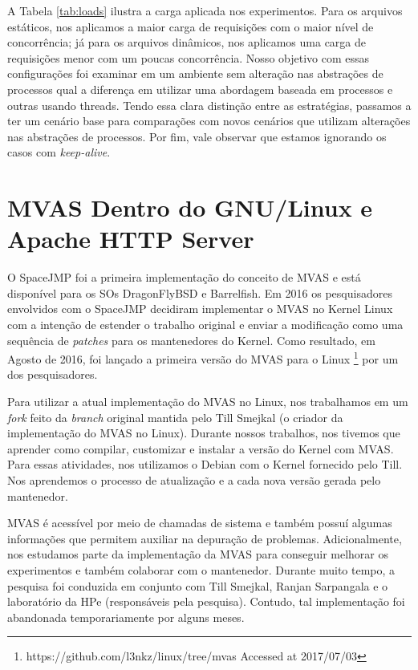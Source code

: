 A Tabela \ref{tab:loads} ilustra a carga aplicada nos experimentos. Para os
arquivos estáticos, nos aplicamos a maior carga de requisições com o maior
nível de concorrência; já para os arquivos dinâmicos, nos aplicamos uma carga
de requisições menor com um poucas concorrência. Nosso objetivo com essas
configurações foi examinar em um ambiente sem alteração nas abstrações de
processos qual a diferença em utilizar uma abordagem baseada em processos e
outras usando threads. Tendo essa clara distinção entre as estratégias,
passamos a ter um cenário base para comparações com novos cenários que utilizam
alterações nas abstrações de processos. Por fim, vale observar que estamos
ignorando os casos com \emph{keep-alive}.

\section{MVAS Dentro do GNU/Linux e Apache HTTP Server}
\label{sec:mvas_inside_httpd}

O SpaceJMP \citep{spacejmp} foi a primeira implementação do conceito de MVAS e
está disponível para os SOs DragonFlyBSD e Barrelfish. Em 2016 os pesquisadores
envolvidos com o SpaceJMP decidiram implementar o MVAS no Kernel Linux com a
intenção de estender o trabalho original e enviar a modificação como uma
sequência de \emph{patches} para os mantenedores do Kernel. Como resultado, em
Agosto de 2016, foi lançado a primeira versão do MVAS para o Linux
\footnote{https://github.com/l3nkz/linux/tree/mvas Accessed at 2017/07/03} por
um dos pesquisadores.
 
Para utilizar a atual implementação do MVAS no Linux, nos trabalhamos em um
\emph{fork} feito da \emph{branch} original mantida pelo Till Smejkal (o
criador da implementação do MVAS no Linux). Durante nossos trabalhos, nos
tivemos que aprender como compilar, customizar e instalar a versão do Kernel
com MVAS. Para essas atividades, nos utilizamos o Debian com o Kernel fornecido
pelo Till. Nos aprendemos o processo de atualização e a cada nova versão gerada
pelo mantenedor.

MVAS é acessível por meio de chamadas de sistema e também possuí algumas
informações que permitem auxiliar na depuração de problemas. Adicionalmente,
nos estudamos parte da implementação da MVAS para conseguir melhorar os
experimentos e também colaborar com o mantenedor. Durante muito tempo, a
pesquisa foi conduzida em conjunto com Till Smejkal, Ranjan Sarpangala e o
laboratório da HPe (responsáveis pela pesquisa). Contudo, tal implementação foi
abandonada temporariamente por alguns meses.
 
